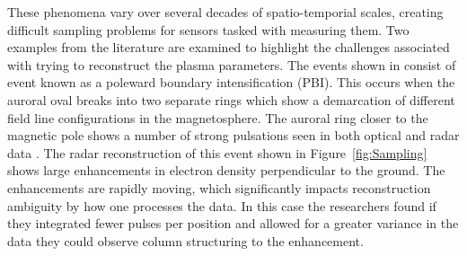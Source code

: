 These phenomena vary over several decades of spatio-temporial scales, creating difficult sampling problems for sensors tasked with measuring them. Two examples from the literature are examined to highlight the challenges associated with trying to reconstruct the plasma parameters.
The events shown in \cite{Semeter:2005fo} consist of event known as a poleward boundary intensification (PBI). This occurs when the auroral oval breaks into two separate rings which show a demarcation of different field line configurations in the magnetosphere. The auroral ring closer to the magnetic pole shows a number of strong pulsations seen in both optical and radar data \cite{Semeter:2005fo} .
The radar reconstruction of this event shown in Figure~\ref{fig:Sampling} shows large enhancements in electron density perpendicular to the ground. The enhancements are rapidly moving, which significantly impacts reconstruction ambiguity by how one processes the data. In this case the researchers found if they integrated fewer pulses per position and allowed for a greater variance in the data they could observe column structuring to the enhancement.
%
%


